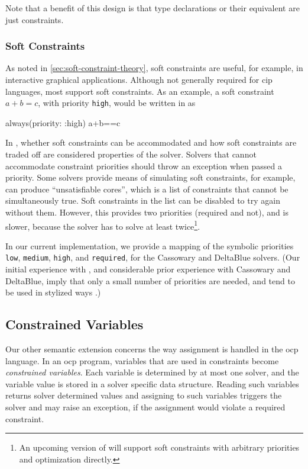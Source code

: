 Note that a benefit of this design is that type declarations or
their equivalent are just constraints.

\subsubsection{Soft Constraints}
\label{sec:soft-constraints}
As noted in \autoref{sec:soft-constraint-theory}, soft constraints
are useful, for example, in interactive graphical
applications. Although not generally required for \ac{cip} languages,
most support soft constraints. As an example, a soft constraint
$a+b=c$, with priority \lstinline{high}, would be written in \toolname
as
\begin{code}[numbers=none]
always(priority: :high) {a+b==c}
\end{code}

In \langname, whether soft constraints can be accommodated and how
soft constraints are traded off are considered properties of the
solver. Solvers that cannot accommodate constraint priorities should
throw an exception when passed a priority. Some solvers provide means
of simulating soft constraints, for example, \zthree can produce
``unsatisfiable cores'', which is a list of constraints that cannot be
simultaneously true. Soft constraints in the list can be disabled to
try again without them. However, this provides two priorities
(required and not), and is slower, because the solver has to solve at
least twice\footnote{An upcoming version of \zthree will support soft
  constraints with arbitrary priorities and optimization directly.}.

In our current implementation, we provide a mapping of the symbolic
priorities \lstinline{low}, \lstinline{medium}, \lstinline{high}, and
\lstinline{required}, for the Cassowary and DeltaBlue solvers.  (Our
initial experience with \toolname, and considerable prior experience
with Cassowary and DeltaBlue, imply that only a small number of
priorities are needed, and tend to be used in stylized ways
\cite{badros-tochi-2001}.)

\subsection{Constrained Variables}
\label{sec:constrained-variables}
Our other semantic extension concerns the way assignment is handled in the
\acrlong{ocp} language. In an \ac{ocp} program, variables that are
used in constraints become \emph{constrained variables}. Each variable
is determined by at most one solver, and the variable value is stored
in a solver specific data structure. Reading such variables returns
solver determined values and assigning to such variables triggers the
solver and may raise an exception, if the assignment would violate a
required constraint.

